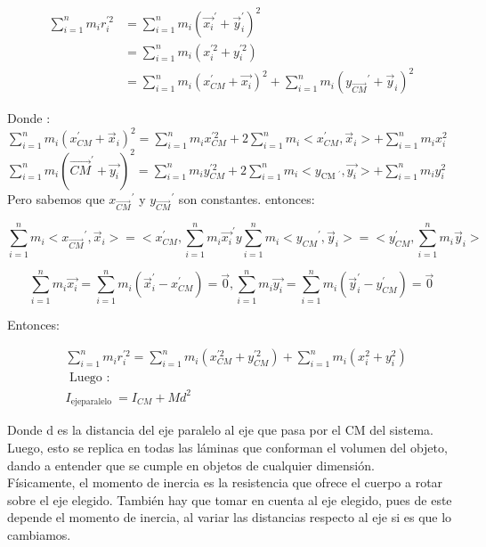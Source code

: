 \documentclass[10pt]{article}
\begin{document}
$$
\begin{aligned}
\sum_{i=1}^{n} m_{i} r_{i}^{\prime 2} & =\sum_{i=1}^{n} m_{i}\left({\overrightarrow{x_{i}}}^{\prime}+\vec{y}_{i}^{\prime}\right)^{2} \\
& =\sum_{i=1}^{n} m_{i}\left(x_{i}^{\prime 2}+y_{i}^{\prime 2}\right) \\
& =\sum_{i=1}^{n} m_{i}\left(x_{C M}^{\prime}+\overrightarrow{x_{i}}\right)^{2}+\sum_{i=1}^{n} m_{i}\left(y_{\overrightarrow{C M}}{ }^{\prime}+\vec{y}_{i}\right)^{2}
\end{aligned}
$$

Donde :\\
$\sum_{i=1}^{n} m_{i}\left(x_{C M}^{\prime}+\vec{x}_{i}\right)^{2}=\sum_{i=1}^{n} m_{i} x_{C M}^{\prime 2}+2 \sum_{i=1}^{n} m_{i}<x_{C M}^{\prime}, \vec{x}_{i}>+\sum_{i=1}^{n} m_{i} x_{i}^{2}$\\
$\sum_{i=1}^{n} m_{i}\left(\overrightarrow{C M}^{\prime}+\overrightarrow{y_{i}}\right)^{2}=\sum_{i=1}^{n} m_{i} y_{C M}^{\prime 2}+2 \sum_{i=1}^{n} m_{i}<y_{\text {CM }^{\prime}}, \overrightarrow{y_{i}}>+\sum_{i=1}^{n} m_{i} y_{i}^{2}$\\
Pero sabemos que $x_{\overrightarrow{C M}}{ }^{\prime}$ y $y_{\overrightarrow{C M}}{ }^{\prime}$ son constantes. entonces:

$$
\sum_{i=1}^{n} m_{i}<x_{\overrightarrow{C M}}{ }^{\prime}, \vec{x}_{i}>=<x_{C M}^{\prime}, \sum_{i=1}^{n} m_{i}{\overrightarrow{x_{i}}}^{\prime} y \sum_{i=1}^{n} m_{i}<y_{C M}{ }^{\prime}, \vec{y}_{i}>=<y_{C M}^{\prime}, \sum_{i=1}^{n} m_{i} \vec{y}_{i}>
$$

$$
\sum_{i=1}^{n} m_{i} \overrightarrow{x_{i}}=\sum_{i=1}^{n} m_{i}\left(\vec{x}_{i}^{\prime}-x_{C M}^{\prime}\right)=\overrightarrow{0}, \sum_{i=1}^{n} m_{i} \overrightarrow{y_{i}}=\sum_{i=1}^{n} m_{i}\left(\vec{y}_{i}^{\prime}-y_{C M}^{\prime}\right)=\overrightarrow{0}
$$

Entonces:

$$
\begin{aligned}
& \sum_{i=1}^{n} m_{i} r_{i}^{\prime 2}=\sum_{i=1}^{n} m_{i}\left(x_{C M}^{\prime 2}+y_{C M}^{\prime 2}\right)+\sum_{i=1}^{n} m_{i}\left(x_{i}^{2}+y_{i}^{2}\right) \\
& \text { Luego }: \\
& I_{\text {ejeparalelo }}=I_{C M}+M d^{2}
\end{aligned}
$$

Donde d es la distancia del eje paralelo al eje que pasa por el CM del sistema. Luego, esto se replica en todas las láminas que conforman el volumen del objeto, dando a entender que se cumple en objetos de cualquier dimensión.\\
Físicamente, el momento de inercia es la resistencia que ofrece el cuerpo a rotar sobre el eje elegido. También hay que tomar en cuenta al eje elegido, pues de este depende el momento de inercia, al variar las distancias respecto al eje si es que lo cambiamos.
\end{document}
